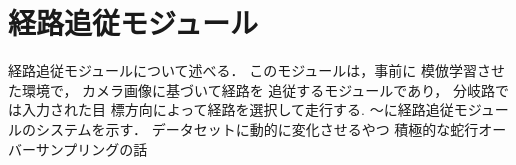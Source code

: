 \section{経路追従モジュール}
経路追従モジュールについて述べる．
このモジュールは，事前に 模倣学習させた環境で，
カメラ画像に基づいて経路を 追従するモジュールであり，
分岐路では入力された目 標方向によって経路を選択して走行する.
〜に経路追従モジュールのシステムを示す．
データセットに動的に変化させるやつ
積極的な蛇行オーバーサンプリングの話